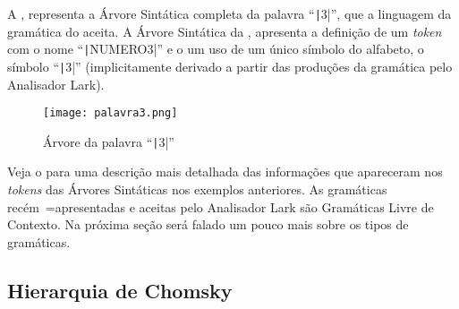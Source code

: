 A ,
representa a Árvore Sintática completa da palavra ``\texttt|3|'',
que a linguagem da gramática do  aceita.
A Árvore Sintática da ,
apresenta a definição de um \textit{token} com o nome ``\texttt|NUMERO3|'' e
o um uso de um único símbolo do alfabeto,
o símbolo ``\texttt|3|'' (implicitamente derivado a partir das produções da gramática pelo Analisador Lark).
\begin{figure}[H]
\caption[Árvore da palavra ``3'']{Árvore da palavra ``\texttt|3|''}
\label{figure:palavra3}
\centering
\texttt{[image: palavra3.png]}
\end{figure}

Veja o  para uma descrição mais detalhada das informações que apareceram nos \textit{tokens} das Árvores Sintáticas nos exemplos anteriores.
As gramáticas recém~=apresentadas e
aceitas pelo Analisador Lark são Gramáticas Livre de Contexto.
Na próxima seção será falado um pouco mais sobre os tipos de gramáticas.


\subsection{Hierarquia de Chomsky}
\label{section:sectionHierarquiaDeChomsky}

